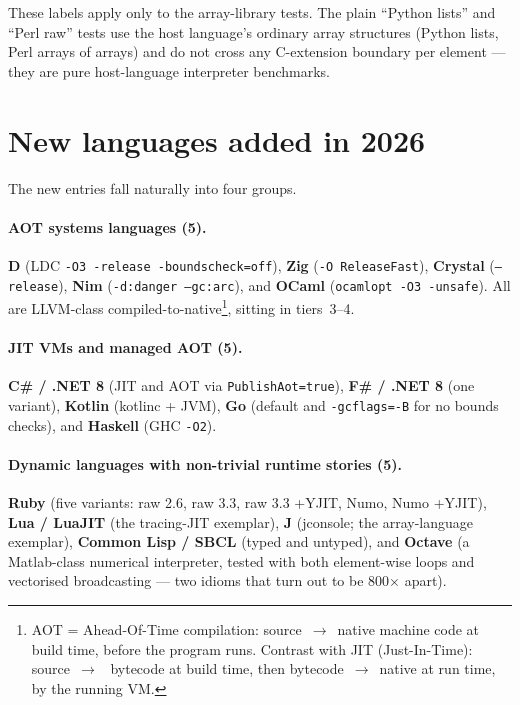 \documentclass[11pt,a4paper]{article}
\begin{document}
These labels apply only to the array-library tests. The plain
``Python lists'' and ``Perl raw'' tests use the host language's
ordinary array structures (Python lists, Perl arrays of arrays) and
do not cross any C-extension boundary per element --- they are pure
host-language interpreter benchmarks.

\section{New languages added in 2026}

The new entries fall naturally into four groups.

\paragraph{AOT systems languages (5).}
\textbf{D} (LDC \texttt{-O3 -release -boundscheck=off}),
\textbf{Zig} (\texttt{-O ReleaseFast}),
\textbf{Crystal} (\texttt{--release}),
\textbf{Nim} (\texttt{-d:danger --gc:arc}),
and \textbf{OCaml} (\texttt{ocamlopt -O3 -unsafe}). All are
LLVM-class compiled-to-native\footnote{AOT = Ahead-Of-Time
compilation: source~$\to$~native machine code at build time, before
the program runs. Contrast with JIT (Just-In-Time): source~$\to$~%
bytecode at build time, then bytecode~$\to$~native at run time, by
the running VM.}, sitting in tiers~3--4.

\paragraph{JIT VMs and managed AOT (5).}
\textbf{C\# / .NET 8} (JIT and AOT via \texttt{PublishAot=true}),
\textbf{F\# / .NET 8} (one variant), \textbf{Kotlin} (kotlinc + JVM),
\textbf{Go} (default and \texttt{-gcflags=-B} for no bounds checks),
and \textbf{Haskell} (GHC \texttt{-O2}).

\paragraph{Dynamic languages with non-trivial runtime stories (5).}
\textbf{Ruby} (five variants: raw 2.6, raw 3.3, raw 3.3 +YJIT, Numo,
Numo +YJIT), \textbf{Lua / LuaJIT} (the tracing-JIT exemplar),
\textbf{J} (jconsole; the array-language exemplar),
\textbf{Common Lisp / SBCL} (typed and untyped), and \textbf{Octave}
(a Matlab-class numerical interpreter, tested with both
element-wise loops and vectorised broadcasting --- two idioms that
turn out to be 800$\times$ apart).
\end{document}
